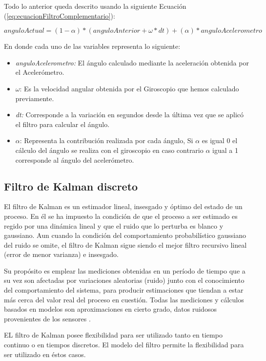\documentclass[12pt,a4paper]{article}
\begin{document}
		Todo lo anterior queda descrito usando la siguiente Ecuación (\ref{eq:ecuacionFiltroComplementario}):
		
		\begin{equation}
		\label{eq:ecuacionFiltroComplementario}
		anguloActual = (1-\alpha)*(anguloAnterior+\omega*dt)+(\alpha)*anguloAcelerometro
		\end{equation}
		
		En donde cada uno de las variables representa lo siguiente:
		\begin{itemize}
			\item \textit{anguloAcelerometro:} El ángulo calculado mediante la aceleración obtenida por el Acelerómetro.
			\item $\omega$: Es la velocidad angular obtenida por el Giroscopio que hemos calculado previamente.
			\item \textit{dt:} Corresponde a la variación en segundos desde la última vez que se aplicó el filtro para calcular el ángulo.
			\item $\alpha$: Representa la contribución realizada por cada ángulo, Si $\alpha$ es igual 0 el cálculo del ángulo se realiza con el giroscopio en caso contrario $\alpha$ igual a 1 corresponde al ángulo del acelerómetro.
			\end{itemize}

\subsection{Filtro de Kalman discreto}
El filtro de Kalman es un estimador lineal, insesgado y óptimo del estado de un proceso. En él se ha impuesto la condición de que el proceso a ser estimado es regido por una dinámica lineal y que el ruido que lo perturba es blanco y gaussiano. Aun cuando la condición del comportamiento probabilístico gaussiano del ruido se omite, el filtro de Kalman sigue siendo el mejor filtro recursivo lineal (error de menor varianza) e insesgado.

Su propósito es emplear las mediciones obtenidas en un período de tiempo que a su vez son afectadas por variaciones  aleatorias (ruido) junto con el conocimiento del comportamiento del sistema, para producir estimaciones que tiendan a estar más cerca del valor real del proceso en cuestión. Todas las mediciones y cálculos basados en modelos son aproximaciones en cierto grado, datos ruidosos provenientes de los sensores \cite[Capítulo 3, p.~45]{TesisUSM}. 

EL filtro de Kalman posee flexibilidad para ser utilizado tanto en tiempo continuo o en tiempos discretos. El modelo del filtro permite la flexibilidad para ser utilizado en éstos casos.
\end{document}
